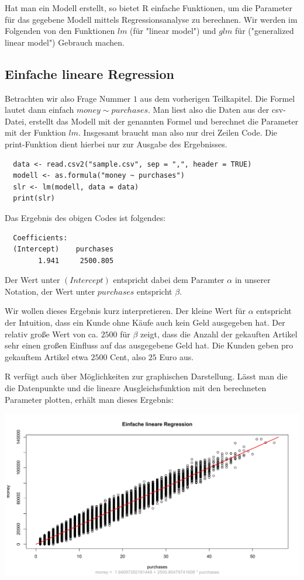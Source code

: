 Hat man ein Modell erstellt, so bietet R einfache Funktionen, um die Parameter für das gegebene Modell mittels Regressionsanalyse zu berechnen. Wir werden im Folgenden von den Funktionen $lm$ (für "linear model") und $glm$ für ("generalized linear model") Gebrauch machen.

\subsection{Einfache lineare Regression}

Betrachten wir also Frage Nummer $1$ aus dem vorherigen Teilkapitel. Die Formel lautet dann einfach $money \sim purchases$. Man liest also die Daten aus der csv-Datei, erstellt das Modell mit der genannten Formel und berechnet die Parameter mit der Funktion $lm$. Insgesamt braucht man also nur drei Zeilen Code. Die print-Funktion dient hierbei nur zur Ausgabe des Ergebnisses.

\begin{verbatim}
  data <- read.csv2("sample.csv", sep = ",", header = TRUE)
  modell <- as.formula("money ~ purchases")
  slr <- lm(modell, data = data)
  print(slr)
\end{verbatim}

Das Ergebnis des obigen Codes ist folgendes:

\begin{verbatim}
  Coefficients:
  (Intercept)    purchases
        1.941     2500.805
\end{verbatim}

Der Wert unter $(Intercept)$ entspricht dabei dem Paramter $\alpha$ in unserer Notation, der Wert unter $purchases$ entspricht $\beta$.

Wir wollen dieses Ergebnis kurz interpretieren. Der kleine Wert für $\alpha$ entspricht der Intuition, dass ein Kunde ohne Käufe auch kein Geld ausgegeben hat. Der relativ große Wert von ca. $2500$ für $\beta$ zeigt, dass die Anzahl der gekauften Artikel sehr einen großen Einfluss auf das ausgegebene Geld hat. Die Kunden geben pro gekauftem Artikel etwa $2500$ Cent, also $25$ Euro aus.

R verfügt auch über Möglichkeiten zur graphischen Darstellung. Lässt man die die Datenpunkte und die lineare Ausgleichsfunktion mit den berechneten Parameter plotten, erhält man dieses Ergebnis:

\includegraphics[width=\textwidth]{r-simpleLinearRegression}

